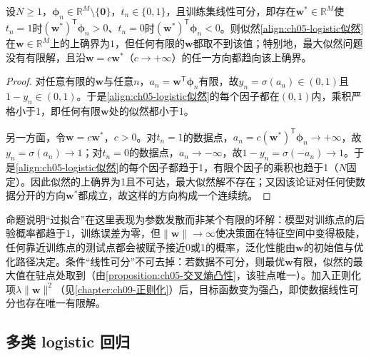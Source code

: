 \documentclass[../../main.tex]{subfiles}
\begin{document}
\begin{proposition}[线性可分数据的最大似然问题无有限解]\label{proposition:ch05-线性可分最大似然}
设$N\geqslant1$，$\boldsymbol{\phi}_n\in\mathbb{R}^{M}\setminus\{\boldsymbol{0}\}$，$t_n\in\{0,1\}$，且训练集线性可分，即存在$\boldsymbol{w}^{*}\in\mathbb{R}^{M}$使$t_n=1$时$(\boldsymbol{w}^{*})^{\mathsf{T}}\boldsymbol{\phi}_n>0$、$t_n=0$时$(\boldsymbol{w}^{*})^{\mathsf{T}}\boldsymbol{\phi}_n<0$。则似然\eqref{align:ch05-logistic似然}在$\boldsymbol{w}\in\mathbb{R}^{M}$上的上确界为$1$，但任何有限的$\boldsymbol{w}$都取不到该值；特别地，最大似然问题没有有限解，且沿$\boldsymbol{w}=c\boldsymbol{w}^{*}$（$c\to+\infty$）的任一方向都趋向该上确界。
\end{proposition}

\begin{proof}
对任意有限的$\boldsymbol{w}$与任意$n$，$a_n=\boldsymbol{w}^{\mathsf{T}}\boldsymbol{\phi}_n$有限，故$y_n=\sigma(a_n)\in(0,1)$且$1-y_n\in(0,1)$。于是\eqref{align:ch05-logistic似然}的每个因子都在$(0,1)$内，乘积严格小于1，即任何有限$\boldsymbol{w}$处的似然都小于1。

另一方面，令$\boldsymbol{w}=c\boldsymbol{w}^{*}$，$c>0$。对$t_n=1$的数据点，$a_n=c(\boldsymbol{w}^{*})^{\mathsf{T}}\boldsymbol{\phi}_n\to+\infty$，故$y_n=\sigma(a_n)\to1$；对$t_n=0$的数据点，$a_n\to-\infty$，故$1-y_n=\sigma(-a_n)\to1$。于是\eqref{align:ch05-logistic似然}的每个因子都趋于1，有限个因子的乘积也趋于1（$N$固定）。因此似然的上确界为1且不可达，最大似然解不存在；又因该论证对任何使数据分开的方向$\boldsymbol{w}^{*}$都成立，故这样的方向构成一个连续统。
\end{proof}

\begin{remark}
命题说明“过拟合”在这里表现为参数发散而非某个有限的坏解：模型对训练点的后验概率都趋于1，训练误差为零，但$\lVert\boldsymbol{w}\rVert\to\infty$使决策面在特征空间中变得极陡，任何靠近训练点的测试点都会被赋予接近0或1的概率，泛化性能由$\boldsymbol{w}$的初始值与优化路径决定。条件“线性可分”不可去掉：若数据不可分，则最优$\boldsymbol{w}$有限，似然的最大值在驻点处取到（由\cref{proposition:ch05-交叉熵凸性}，该驻点唯一）。加入正则化项$\lambda\lVert\boldsymbol{w}\rVert^{2}$（见\cref{chapter:ch09-正则化}）后，目标函数变为强凸，即使数据线性可分也存在唯一有限解。
\end{remark}

\subsection{多类 logistic 回归}\label{subsection:ch05-多类logistic回归}
\end{document}
